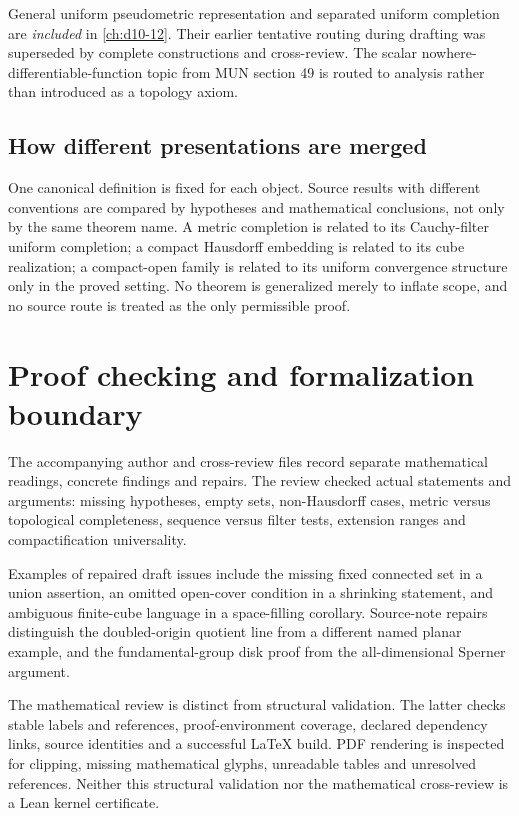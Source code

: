 \documentclass[11pt,oneside,openany]{book}
\theoremstyle{definition}
\theoremstyle{remark}
\begin{document}
General uniform pseudometric representation and separated uniform completion
are \emph{included} in \cref{ch:d10-12}. Their earlier tentative routing during
drafting was superseded by complete constructions and cross-review.
The scalar nowhere-differentiable-function topic from MUN section 49 is
routed to analysis rather than introduced as a topology axiom.

\section*{How different presentations are merged}
One canonical definition is fixed for each object. Source results with
different conventions are compared by hypotheses and mathematical
conclusions, not only by the same theorem name. A metric completion is
related to its Cauchy-filter uniform completion; a compact Hausdorff
embedding is related to its cube realization; a compact-open family is
related to its uniform convergence structure only in the proved setting.
No theorem is generalized merely to inflate scope, and no source route
is treated as the only permissible proof.



\chapter{Proof checking and formalization boundary}
\label{app:d10-verification}
The accompanying author and cross-review files record separate mathematical
readings, concrete findings and repairs. The review checked actual
statements and arguments: missing hypotheses, empty sets, non-Hausdorff
cases, metric versus topological completeness, sequence versus filter
tests, extension ranges and compactification universality.

Examples of repaired draft issues include the missing fixed connected set
in a union assertion, an omitted open-cover condition in a shrinking
statement, and ambiguous finite-cube language in a space-filling
corollary. Source-note repairs distinguish the doubled-origin quotient
line from a different named planar example, and the fundamental-group
disk proof from the all-dimensional Sperner argument.

The mathematical review is distinct from structural validation.
The latter checks stable labels and references, proof-environment coverage,
declared dependency links, source identities and a successful LaTeX build.
PDF rendering is inspected for clipping, missing mathematical glyphs,
unreadable tables and unresolved references. Neither this structural
validation nor the mathematical cross-review is a Lean kernel certificate.
\end{document}
